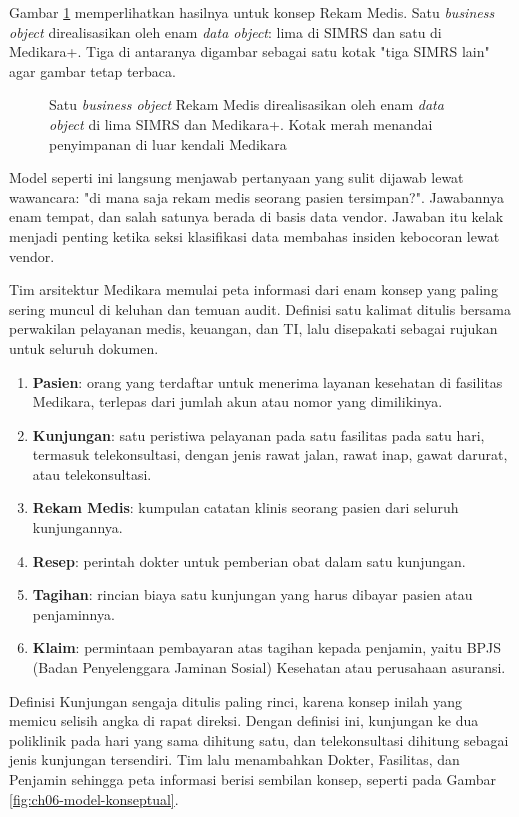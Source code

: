 Gambar \ref{fig:ch06-objek-archimate} memperlihatkan hasilnya untuk konsep
Rekam Medis. Satu \textit{business object} direalisasikan oleh enam
\textit{data object}: lima di SIMRS dan satu di Medikara+. Tiga di antaranya
digambar sebagai satu kotak "tiga SIMRS lain" agar gambar tetap terbaca.

\begin{figure}[!htb]
  \centering
  
  \caption{Satu \textit{business object} Rekam Medis direalisasikan oleh enam
           \textit{data object} di lima SIMRS dan Medikara+. Kotak merah menandai
           penyimpanan di luar kendali Medikara}
  \label{fig:ch06-objek-archimate}
\end{figure}

Model seperti ini langsung menjawab pertanyaan yang sulit dijawab lewat
wawancara: "di mana saja rekam medis seorang pasien tersimpan?". Jawabannya
enam tempat, dan salah satunya berada di basis data vendor. Jawaban itu kelak
menjadi penting ketika seksi klasifikasi data membahas insiden kebocoran lewat
vendor.

\begin{kasus}[title={Kasus Medikara Health: Enam Konsep Inti}]
  Tim arsitektur Medikara memulai peta informasi dari enam konsep yang paling
  sering muncul di keluhan dan temuan audit. Definisi satu kalimat ditulis
  bersama perwakilan pelayanan medis, keuangan, dan TI, lalu disepakati
  sebagai rujukan untuk seluruh dokumen.

  \begin{enumerate}
    \item \textbf{Pasien}: orang yang terdaftar untuk menerima layanan
          kesehatan di fasilitas Medikara, terlepas dari jumlah akun atau
          nomor yang dimilikinya.
    \item \textbf{Kunjungan}: satu peristiwa pelayanan pada satu fasilitas pada
          satu hari, termasuk telekonsultasi, dengan jenis rawat jalan, rawat
          inap, gawat darurat, atau telekonsultasi.
    \item \textbf{Rekam Medis}: kumpulan catatan klinis seorang pasien dari
          seluruh kunjungannya.
    \item \textbf{Resep}: perintah dokter untuk pemberian obat dalam satu
          kunjungan.
    \item \textbf{Tagihan}: rincian biaya satu kunjungan yang harus dibayar
          pasien atau penjaminnya.
    \item \textbf{Klaim}: permintaan pembayaran atas tagihan kepada penjamin,
          yaitu BPJS (Badan Penyelenggara Jaminan Sosial) Kesehatan atau
          perusahaan asuransi.
  \end{enumerate}

  Definisi Kunjungan sengaja ditulis paling rinci, karena konsep inilah yang
  memicu selisih angka di rapat direksi. Dengan definisi ini, kunjungan ke dua
  poliklinik pada hari yang sama dihitung satu, dan telekonsultasi dihitung
  sebagai jenis kunjungan tersendiri. Tim lalu menambahkan Dokter, Fasilitas,
  dan Penjamin sehingga peta informasi berisi sembilan konsep, seperti pada
  Gambar \ref{fig:ch06-model-konseptual}.
\end{kasus}

